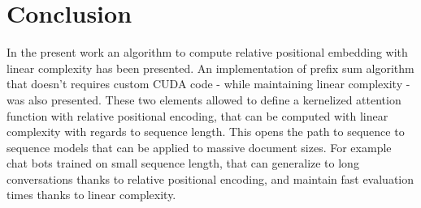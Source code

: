 \section{Conclusion}

In the present work an algorithm to compute
\citet{shaw2018selfattention} relative
positional embedding with linear complexity has been presented. An implementation of \citet{choromanski2021rethinking} prefix sum algorithm that doesn't requires custom CUDA code - while maintaining linear complexity - was also presented. These two elements allowed to define a kernelized attention function with relative positional encoding, that can be computed with linear complexity with regards to sequence length. This opens the path to sequence to sequence models that can be applied to massive document sizes. For example chat bots trained on small sequence length, that can generalize to long conversations thanks to relative positional encoding, and maintain fast evaluation times thanks to linear complexity.

\endinput
